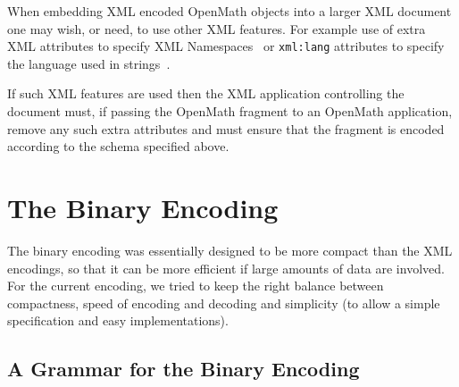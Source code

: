 \documentclass{report}
\def\OM{OpenMath\xspace}
\def\XML{XML\xspace}
\begin{document}
When embedding \XML encoded \OM objects into a larger \XML document one may wish, or need,
to use other \XML features. For example use of extra \XML attributes to specify \XML
Namespaces~\cite{xmlns} or \lstinline|xml:lang| attributes to specify the language used
in strings~\cite{xml_04}.

If such \XML features are used then the \XML application controlling the document must, if
passing the \OM fragment to an \OM application, remove any such extra attributes and must
ensure that the fragment is encoded according to the schema specified above.

\section{The Binary Encoding}\label{sec_binary}

The binary encoding was essentially designed to be more compact than the \XML encodings,
so that it can be more efficient if large amounts of data are involved. For the current
encoding, we tried to keep the right balance between compactness, speed of encoding and
decoding and simplicity (to allow a simple specification and easy implementations).

\subsection{A Grammar for the Binary Encoding}\label{sec_binary_grammar}
\end{document}
